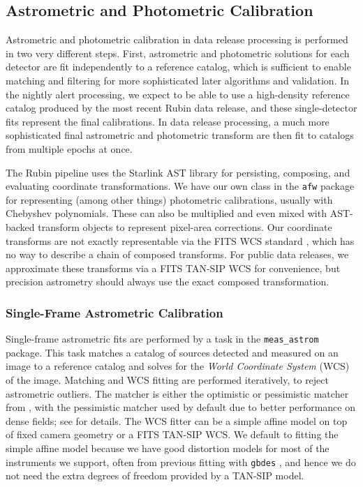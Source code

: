 \subsection{Astrometric and Photometric Calibration}
\label{sec:calibration}

Astrometric and photometric calibration in data release processing is performed in two very different steps.
First, astrometric and photometric solutions for each detector are fit independently to a reference catalog, which is sufficient to enable matching and filtering for more sophisticated later algorithms and validation.
In the nightly alert processing, we expect to be able to use a high-density reference catalog produced by the most recent Rubin data release, and these single-detector fits represent the final calibrations.
In data release processing, a much more sophisticated final astrometric and photometric transform are then fit to catalogs from multiple epochs at once.

The Rubin pipeline uses the Starlink AST library \citep{2016A&C....15...33B} for persisting, composing, and evaluating coordinate transformations.
We have our own class in the \texttt{afw} package for representing (among other things) photometric calibrations, usually with Chebyshev polynomials.
These can also be multiplied and even mixed with AST-backed transform objects to represent pixel-area corrections.
Our coordinate transforms are not exactly representable via the FITS WCS standard \citep{2002A&A...395.1061G}, which has no way to describe a chain of composed transforms.
For public data releases, we approximate these transforms via a FITS TAN-SIP WCS \citep{2005ASPC..347..491S} for convenience, but precision astrometry should always use the exact composed transformation.

\subsubsection{Single-Frame Astrometric Calibration}
\label{sec:astrometryTask}

Single-frame astrometric fits are performed by a task in the \texttt{meas\_astrom} package.
This task matches a catalog of sources detected and measured on an image to a reference catalog and solves for the \textit{World Coordinate System} (WCS) of the image.
Matching and WCS fitting are performed iteratively, to reject astrometric outliers.
The matcher is either the optimistic or pessimistic matcher from \citet{2007PASA...24..189T}, with the pessimistic matcher used by default due to better performance on dense fields; see \citep{DMTN-031} for details.
The WCS fitter can be a simple affine model on top of fixed camera geometry or a FITS TAN-SIP WCS.
We default to fitting the simple affine model because we have good distortion models for most of the instruments we support, often from previous fitting with \texttt{gbdes} , and hence we do not need the extra degrees of freedom provided by a TAN-SIP model.

